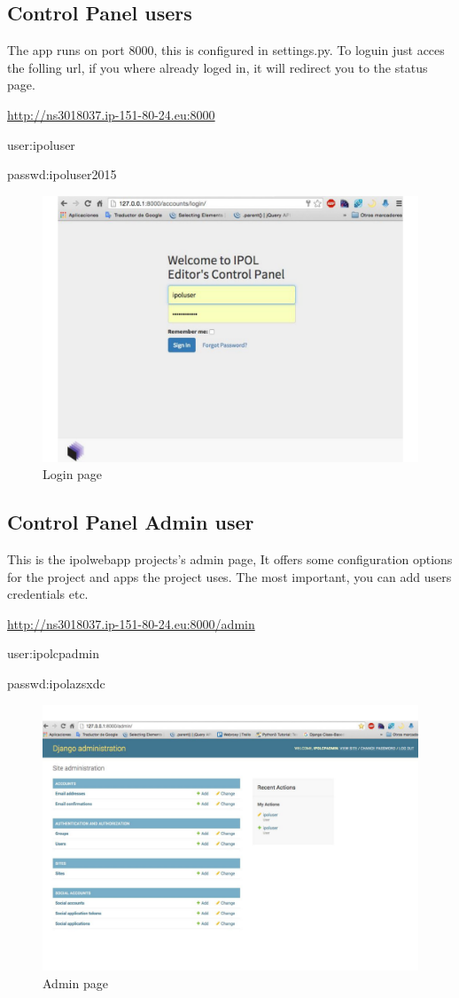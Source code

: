 \subsection{Control Panel users}
The app runs on port 8000, this is configured in settings.py.
To loguin just acces the folling url, if you where already loged in, it will redirect you to the status page.

\url{http://ns3018037.ip-151-80-24.eu:8000}

user:ipoluser

passwd:ipoluser2015

\begin{figure}[!ht]
\centering
\includegraphics[width=0.5\columnwidth]{control_panel/images/login.pdf}
\caption{Login page} 
\label{fi:login_page}
\end{figure}

\subsection{Control Panel Admin user}
This is the ipolwebapp projects's admin page, 
It offers some configuration options for the project and apps the project uses. The most important, you can add users credentials etc.

\url{http://ns3018037.ip-151-80-24.eu:8000/admin}

user:ipolcpadmin

passwd:ipolazsxdc

\begin{figure}[!ht]
\centering
\includegraphics[width=0.5\columnwidth]{control_panel/images/admin.pdf}
\caption{Admin page} 
\label{fi:admin_page}
\end{figure}


